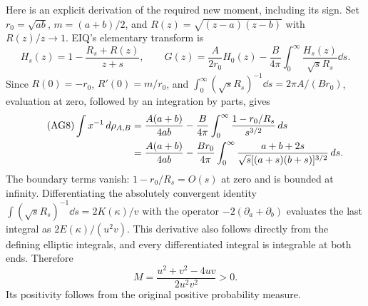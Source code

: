 Here is an explicit derivation of the required new moment, including its sign.
Set $r_0=\sqrt{ab}$, $m=(a+b)/2$, and
$R(z)=\sqrt{(z-a)(z-b)}$ with $R(z)/z\to1$. EIQ's elementary transform is
\[
 H_s(z)=1-\frac{R_s+R(z)}{z+s},\qquad
 G(z)=\frac{A}{2r_0}H_0(z)-\frac B{4\pi}
       \int_0^\infty\frac{H_s(z)}{\sqrt s R_s}\dd s.
\]
Since $R(0)=-r_0$, $R'(0)=m/r_0$, and
$\int_0^\infty (\sqrt sR_s)^{-1}\dd s=2\pi A/(Br_0)$,
evaluation at zero, followed by an integration by parts, gives
\begin{align}\tag{AG8}
 \int x^{-1}\,d\rho_{A,B}
 &=\frac{A(a+b)}{4ab}
   -\frac B{4\pi}\int_0^\infty
           \frac{1-r_0/R_s}{s^{3/2}}\,d s\\
 &=\frac{A(a+b)}{4ab}
   -\frac{Br_0}{4\pi}\int_0^\infty
         \frac{a+b+2s}{\sqrt s[(a+s)(b+s)]^{3/2}}\,d s.\notag
\end{align}
The boundary terms vanish: $1-r_0/R_s=O(s)$ at zero and is bounded at infinity.
Differentiating the absolutely convergent identity
$\int (\sqrt sR_s)^{-1}\dd s=2K(\kappa)/v$ with the operator
$-2(\partial_a+\partial_b)$ evaluates the last integral as $2E(\kappa)/(u^2v)$.
This derivative also follows directly from the defining elliptic integrals,
and every differentiated integral is integrable at both ends. Therefore
\begin{equation}\tag{AG9}
 M=\frac{u^2+v^2-4uv}{2u^2v^2}>0.
\end{equation}
Its positivity follows from the original positive probability measure.

